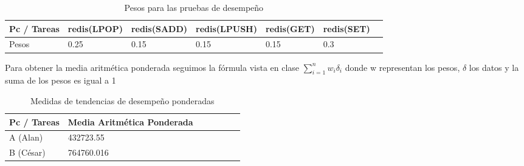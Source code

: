 \documentclass{article}
\begin{document}
\begin{enumerate}
{            \begin{table}[H]
                \caption*{Pesos para las pruebas de desempeño}
                \begin{center}
                    \begin{tabular}{|l|l|l|l|l|l|l|}
                        \toprule
                            Pc / Tareas 
                            & \cellcolor[HTML]{DAE8FC}redis(LPOP) 
                            & \cellcolor[HTML]{DAE8FC}redis(SADD) 
                            & \cellcolor[HTML]{DAE8FC}redis(LPUSH) 
                            & \cellcolor[HTML]{DAE8FC}redis(GET)
                            & \cellcolor[HTML]{DAE8FC}redis(SET) \\ \hline
            
                            \cellcolor[HTML]{F8A102}{\color[HTML]{000000}} 
                            Pesos & 0.25 & 0.15 & 0.15 & 0.15 & 0.3 \\ \hline
        
                        \end{tabular}
                \end{center}
            \end{table} 

			Para obtener la media aritmética ponderada seguimos la fórmula vista en clase $\sum_{i=1}^{n} w_{i}\delta_{i}$ donde w representan los pesos, $\delta$ los datos y la suma de los pesos es igual a 1\\

            \begin{table}[H]
                \caption*{Medidas de tendencias de desempeño ponderadas}
                \begin{center}
                    \begin{tabular}{|l|l|l|l|l|l|l|}
                        \toprule
                            Pc / Tareas 
                            & \cellcolor[HTML]{DAE8FC}Media Aritmética Ponderada \\ \hline
            
                            \cellcolor[HTML]{F8A102}{\color[HTML]{000000}} 
                            A (Alan) & 432723.55 \\ \hline
            
                            \cellcolor[HTML]{FFFE65}{\color[HTML]{000000}}
                            B (César) & 764760.016 \\ \hline
            

\end{tabular}
\end{center}
\end{table}}
\end{enumerate}
\end{document}

